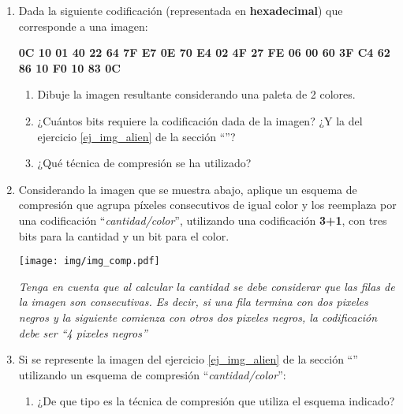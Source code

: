\documentclass[12pt]{article}
\begin{document}
\begin{enumerate}

    \item Dada la siguiente codificación (representada en
        \textbf{hexadecimal}) que corresponde a una imagen:

        \textbf{0C 10 01 40 22 64 7F E7 0E 70 E4 02 4F 27 FE 06 00 60 3F C4 62
        86 10 F0 10 83 0C} \label{ej_img_alien_perdida}

        \begin{enumerate}

            \item Dibuje la imagen resultante considerando una paleta de 2 colores.

            \item ¿Cuántos bits requiere la codificación dada de la imagen? ¿Y
                la del ejercicio \ref{ej_img_alien} de la sección
                ``\textbf{}''?

            \item ¿Qué técnica de compresión se ha utilizado?

        \end{enumerate}

    \item Considerando la imagen que se muestra abajo, aplique un esquema de
        compresión que agrupa píxeles consecutivos de igual color y los
        reemplaza por una codificación ``\emph{cantidad/color}'', utilizando
        una codificación \textbf{3+1}, con tres bits para la cantidad y un bit
        para el color.

        \texttt{[image: img/img\_comp.pdf]}

        \textit{Tenga en cuenta que al calcular la cantidad se debe considerar
        que las filas de la imagen son consecutivas. Es decir, si una fila
        termina con dos pixeles negros y la siguiente comienza con otros dos
        pixeles negros, la codificación debe ser ``4 pixeles negros''}

    \item Si se represente la imagen del ejercicio \ref{ej_img_alien} de la
        sección ``\textbf{}'' utilizando un esquema de
        compresión ``\emph{cantidad/color}'':

        \begin{enumerate}

            \item ¿De que tipo es la técnica de compresión que utiliza el
                esquema indicado?


\end{enumerate}
\end{enumerate}
\end{document}
